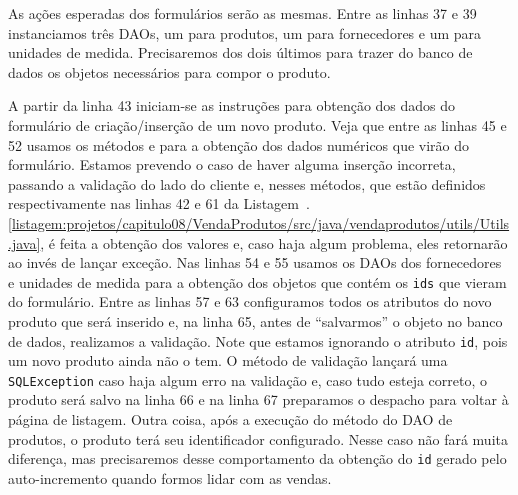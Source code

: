 
As ações esperadas dos formulários serão as mesmas. Entre as linhas 37 e 39 instanciamos três DAOs, um para produtos, um para fornecedores e um para unidades de medida. Precisaremos dos dois últimos para trazer do banco de dados os objetos necessários para compor o produto.

A partir da linha 43 iniciam-se as instruções para obtenção dos dados do formulário de criação/inserção de um novo produto. Veja que entre as linhas 45 e 52 usamos os métodos  e  para a obtenção dos dados numéricos que virão do formulário. Estamos prevendo o caso de haver alguma inserção incorreta, passando a validação do lado do cliente e, nesses métodos, que estão definidos respectivamente nas linhas 42 e 61 da Listagem~\thechapter.\ref{listagem:projetos/capitulo08/VendaProdutos/src/java/vendaprodutos/utils/Utils.java}, é feita a obtenção dos valores e, caso haja algum problema, eles retornarão  ao invés de lançar exceção. Nas linhas 54 e 55 usamos os DAOs dos fornecedores e unidades de medida para a obtenção dos objetos que contém os \texttt{ids} que vieram do formulário. Entre as linhas 57 e 63 configuramos todos os atributos do novo produto que será inserido e, na linha 65, antes de ``salvarmos'' o objeto no banco de dados, realizamos a validação. Note que estamos ignorando o atributo \texttt{id}, pois um novo produto ainda não o tem. O método de validação lançará uma \texttt{SQLException} caso haja algum erro na validação e, caso tudo esteja correto, o produto será salvo na linha 66 e na linha 67 preparamos o despacho para voltar à página de listagem. Outra coisa, após a execução do método  do DAO de produtos, o produto terá seu identificador configurado. Nesse caso não fará muita diferença, mas precisaremos desse comportamento da obtenção do \texttt{id} gerado pelo auto-incremento quando formos lidar com as vendas.

